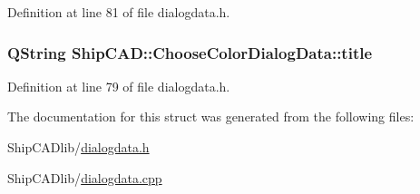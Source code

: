 Definition at line 81 of file dialogdata.\+h.

\subsubsection[{\texorpdfstring{title}{title}}]{\setlength{\rightskip}{0pt plus 5cm}Q\+String Ship\+C\+A\+D\+::\+Choose\+Color\+Dialog\+Data\+::title}\hypertarget{structShipCAD_1_1ChooseColorDialogData_aedfb5ee0ef99d57837d728a477303d0b}{}\label{structShipCAD_1_1ChooseColorDialogData_aedfb5ee0ef99d57837d728a477303d0b}


Definition at line 79 of file dialogdata.\+h.



The documentation for this struct was generated from the following files\+:\begin{DoxyCompactItemize}
\item 
Ship\+C\+A\+Dlib/\hyperlink{dialogdata_8h}{dialogdata.\+h}\item 
Ship\+C\+A\+Dlib/\hyperlink{dialogdata_8cpp}{dialogdata.\+cpp}\end{DoxyCompactItemize}
